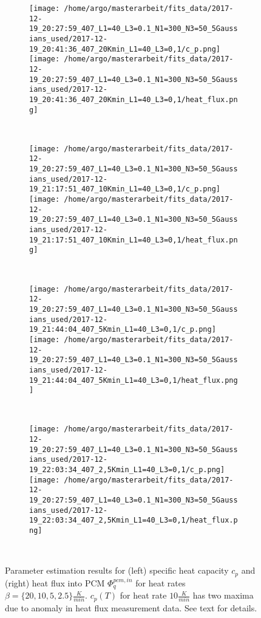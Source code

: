 \documentclass{scrartcl}[12pt, halfparskip]
\numberwithin{equation}{section}
\numberwithin{figure}{section}
\numberwithin{table}{section}
\begin{document}
\begin{figure}[H]
	\begin{subfigure}{1.\textwidth}
		\texttt{[image: /home/argo/masterarbeit/fits\_data/2017-12-19\_20:27:59\_407\_L1=40\_L3=0.1\_N1=300\_N3=50\_5Gaussians\_used/2017-12-19\_20:41:36\_407\_20Kmin\_L1=40\_L3=0,1/c\_p.png]}
		\texttt{[image: /home/argo/masterarbeit/fits\_data/2017-12-19\_20:27:59\_407\_L1=40\_L3=0.1\_N1=300\_N3=50\_5Gaussians\_used/2017-12-19\_20:41:36\_407\_20Kmin\_L1=40\_L3=0,1/heat\_flux.png]}
	\end{subfigure} \\[1ex]
	
	\begin{subfigure}{1.\textwidth}
		\texttt{[image: /home/argo/masterarbeit/fits\_data/2017-12-19\_20:27:59\_407\_L1=40\_L3=0.1\_N1=300\_N3=50\_5Gaussians\_used/2017-12-19\_21:17:51\_407\_10Kmin\_L1=40\_L3=0,1/c\_p.png]}
		\texttt{[image: /home/argo/masterarbeit/fits\_data/2017-12-19\_20:27:59\_407\_L1=40\_L3=0.1\_N1=300\_N3=50\_5Gaussians\_used/2017-12-19\_21:17:51\_407\_10Kmin\_L1=40\_L3=0,1/heat\_flux.png]}
	\end{subfigure} \\[1ex]
	
	\begin{subfigure}{1.\textwidth}
		\texttt{[image: /home/argo/masterarbeit/fits\_data/2017-12-19\_20:27:59\_407\_L1=40\_L3=0.1\_N1=300\_N3=50\_5Gaussians\_used/2017-12-19\_21:44:04\_407\_5Kmin\_L1=40\_L3=0,1/c\_p.png]}
		\texttt{[image: /home/argo/masterarbeit/fits\_data/2017-12-19\_20:27:59\_407\_L1=40\_L3=0.1\_N1=300\_N3=50\_5Gaussians\_used/2017-12-19\_21:44:04\_407\_5Kmin\_L1=40\_L3=0,1/heat\_flux.png]}
	\end{subfigure} \\[1ex]
	
	\begin{subfigure}{1.\textwidth}
		\texttt{[image: /home/argo/masterarbeit/fits\_data/2017-12-19\_20:27:59\_407\_L1=40\_L3=0.1\_N1=300\_N3=50\_5Gaussians\_used/2017-12-19\_22:03:34\_407\_2,5Kmin\_L1=40\_L3=0,1/c\_p.png]}
		\texttt{[image: /home/argo/masterarbeit/fits\_data/2017-12-19\_20:27:59\_407\_L1=40\_L3=0.1\_N1=300\_N3=50\_5Gaussians\_used/2017-12-19\_22:03:34\_407\_2,5Kmin\_L1=40\_L3=0,1/heat\_flux.png]}
	\end{subfigure} \\[1ex]
	

	\caption{Parameter estimation results for (left) specific heat capacity $c_p$ and (right) heat flux into PCM $\varPhi_q^{pcm,in}$ for heat rates $\beta=\{ 20, 10, 5, 2.5 \} \frac{K}{min}$. $c_p(T)$ for heat rate $10 \frac{K}{min}$ has two maxima due to anomaly in heat flux measurement data. See text for details.}
	\label{fig:optim_c_p_heat_flux_5Gaussians_1}
\end{figure}
\end{document}
